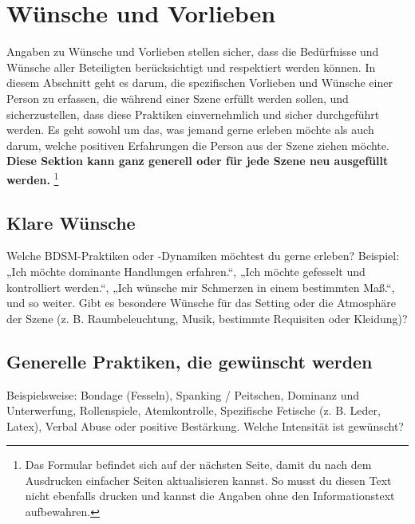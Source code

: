 \documentclass[a4paper,12pt]{article}
\begin{document}
\newpage
\section{Wünsche und Vorlieben}
Angaben zu Wünsche und Vorlieben stellen sicher, dass die Bedürfnisse und Wünsche aller Beteiligten berücksichtigt und respektiert werden können. In diesem Abschnitt geht es darum, die spezifischen Vorlieben und Wünsche einer Person zu erfassen, die während einer Szene erfüllt werden sollen, und sicherzustellen, dass diese Praktiken einvernehmlich und sicher durchgeführt werden. Es geht sowohl um das, was jemand gerne erleben möchte als auch darum, welche positiven Erfahrungen die Person aus der Szene ziehen möchte. \textbf{Diese Sektion kann ganz generell oder für jede Szene neu ausgefüllt werden.} \footnote{Das Formular befindet sich auf der nächsten Seite, damit du nach dem Ausdrucken einfacher Seiten aktualisieren kannst. So musst du diesen Text nicht ebenfalls drucken und kannst die Angaben ohne den Informationstext aufbewahren.}

\newpage

\subsection{Klare Wünsche}
\noindent Welche BDSM-Praktiken oder -Dynamiken möchtest du gerne erleben? Beispiel: „Ich möchte dominante Handlungen erfahren.“, „Ich möchte gefesselt und kontrolliert werden.“, „Ich wünsche mir Schmerzen in einem bestimmten Maß.“, und so weiter. Gibt es besondere Wünsche für das Setting oder die Atmosphäre der Szene (z. B. Raumbeleuchtung, Musik, bestimmte Requisiten oder Kleidung)? \newline
\noindent \TextField[name=WuenscheKlar,multiline=true,height=20em, width=37em]{}

\subsection{Generelle Praktiken, die gewünscht werden}
\noindent Beispielsweise:  Bondage (Fesseln), Spanking / Peitschen, Dominanz und Unterwerfung, Rollenspiele, Atemkontrolle, Spezifische Fetische (z. B. Leder, Latex), Verbal Abuse oder positive Bestärkung. Welche Intensität ist gewünscht? \newline
\noindent \TextField[name=WuenschePraktiken,multiline=true,height=20em, width=37em]{}

\newpage
\end{document}
